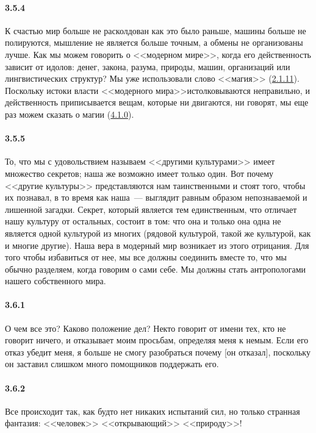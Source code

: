 
\paragraph{3.5.4}\hypertarget{par:3.5.4}{} К счастью мир больше не расколдован как это было раньше, машины больше не полируются, мышление не является больше точным, а обмены не организованы лучше.
Как мы можем говорить о <<модерном мире>>, когда его действенность зависит от идолов: денег, закона, разума, природы, машин, организаций или лингвистических структур? Мы уже использовали слово <<магия>> (\hyperlink{par:2.1.11}{2.1.11}). Поскольку истоки власти <<модерного мира>>истолковываются неправильно, и действенность приписывается вещам, которые ни двигаются, ни говорят, мы еще раз можем сказать о магии (\hyperlink{par:4.1.0}{4.1.0}).

\paragraph{3.5.5}\hypertarget{par:3.5.5}{} То, что мы с удовольствием называем <<другими культурами>> имеет множество секретов; наша же возможно имеет только один. Вот почему <<другие культуры>> представляются нам таинственными и стоят того, чтобы их познавал, в то время как наша~--- выглядит равным образом непознаваемой и лишенной загадки. Секрет, который является тем единственным, что отличает нашу культуру от остальных, состоит в том: что она и только она одна не является одной культурой из многих (рядовой культурой, такой же культурой, как и многие другие). Наша вера в модерный мир возникает из этого отрицания. Для того чтобы избавиться от нее, мы все должны соединить вместе то, что мы обычно разделяем, когда говорим о сами себе. Мы должны стать антропологами нашего собственного мира.

\paragraph{3.6.1}\hypertarget{par:3.6.1}{} О чем все это? Каково положение дел? Некто говорит от имени тех, кто не говорит ничего, и отказывает моим просьбам, определяя меня к немым. Если его отказ убедит меня, я больше не смогу разобраться почему [он отказал], поскольку он заставил слишком
много помощников поддержать его.

\paragraph{3.6.2}\hypertarget{par:3.6.2}{} Все происходит так, как будто нет никаких испытаний сил, но только странная фантазия: <<человек>> <<открывающий>> <<природу>>!

